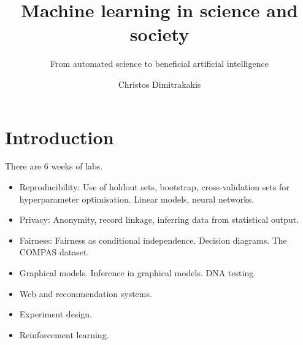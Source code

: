 \documentclass[a4paper,twoside]{article}
\title{Machine learning in science and society}
\subtitle{From automated science to beneficial artificial intelligence}
\author[C. Dimitrakakis]{Christos Dimitrakakis}
\begin{document}
\maketitle
\tableofcontents

\chapter{Introduction}

There are 6 weeks of labs.

\begin{itemize}
\item Reproducibility: Use of holdout sets, bootstrap, cross-validation sets for hyperparameter optimisation. Linear models, neural networks.
\item Privacy: Anonymity, record linkage, inferring data from statistical output. 
\item Fairness: Fairness as conditional independence. Decision diagrams. The COMPAS dataset.
\item Graphical models. Inference in graphical models. DNA testing.
\item Web and recommendation systems.
\item Experiment design.
\item Reinforcement learning.
\end{itemize}
\end{document}
